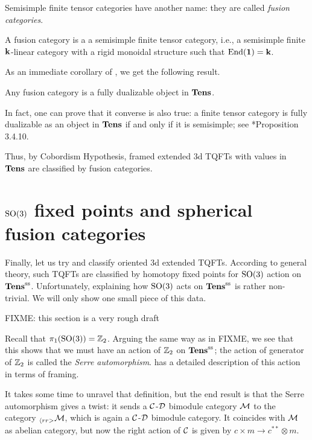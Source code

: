 Semisimple finite tensor categories have another name: they are called
\emph{fusion categories}.


\begin{definition}\label{d:fusion}
  A fusion category is a a semisimple finite tensor category, i.e., a semisimple
  finite $\mathbf{k}$-linear category with a rigid monoidal structure such that
  $\operatorname{End}(\mathbf{1})=\mathbf{k}$.
\end{definition}

As an immediate corollary of , we get the
following result.
\begin{corollary}\label{c:fusion-fd}
  Any fusion category is a fully dualizable object in $\mathbf{Tens}$.
\end{corollary}

In fact, one can prove that it converse is also true: a finite tensor
category is fully dualizable as an object in $\mathbf{Tens}$ if and only if it is
semisimple; see *{Proposition 3.4.10}.

Thus, by Cobordism Hypothesis, framed extended 3d TQFTs with values in $\mathbf{Tens}$
are classified by fusion categories.


\section{$\mathrm{SO}(3)$ fixed points and spherical
    fusion categories}\label{s:spherical1}

Finally, let us try and classify oriented 3d extended TQFTs. According to
general theory, such TQFTs are classified by homotopy fixed points for $\mathrm{SO}(3)$
action on $\mathbf{Tens}^{\mathrm{ss}}$. Unfortunately, explaining how $\mathrm{SO}(3)$ acts on
$\mathbf{Tens}^{\mathrm{ss}}$ is rather non-trivial. We will only show one small piece of this
data.

FIXME: this section is a very rough draft

Recall that $\pi_1(\mathrm{SO}(3))=\mathbb{Z}_2$. Arguing the same way as in FIXME, we see that
this shows that we must have an action of $\mathbb{Z}_2$ on $\mathbf{Tens}^{\mathrm{ss}}$; the action of
generator of $\mathbb{Z}_2$ is called the \emph{Serre automorphism}.
 has a detailed description of this action in terms of
framing.

It takes some time to unravel that definition, but the end result is that the
Serre automorphism gives a twist: it sends a $\mathcal{C}$-$\mathcal{D}$ bimodule category
$\mathcal{M}$ to the category ${}_{\langle rr>}\mathcal{M}$, which is again a $\mathcal{C}$-$\mathcal{D}$
bimodule category. It coincides with $\mathcal{M}$ as abelian category, but now the
right action of $\mathcal{C}$ is given by $c\times m\to c^{**}\otimes m$.

